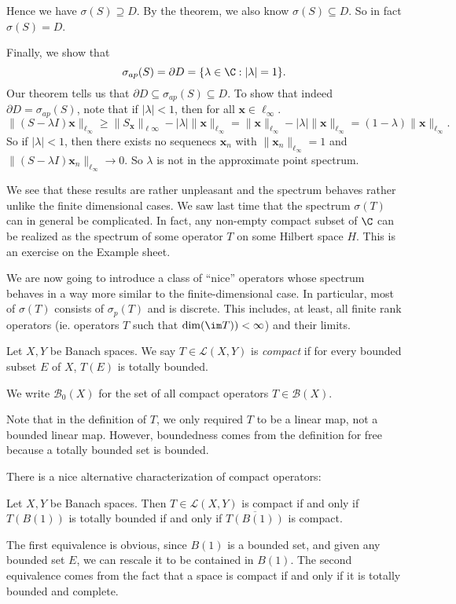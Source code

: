 \documentclass[a4paper]{article}
\begin{document}
\begin{eg}
  Hence we have $\sigma(S) \supseteq D$. By the theorem, we also know $\sigma(S) \subseteq D$. So in fact $\sigma(S) = D$.

  Finally, we show that
  \[
    \sigma_{ap}(S) = \partial D = \{\lambda \in \C: |\lambda| = 1\}.
  \]
  Our theorem tells us that $\partial D \subseteq \sigma_{ap}(S) \subseteq D$. To show that indeed $\partial D = \sigma_{ap}(S)$, note that if $|\lambda| < 1$, then for all $\mathbf{x} \in \ell_\infty$.
  \[
    \|(S - \lambda I)\mathbf{x}\|_{\ell_\infty} \geq \|S_\mathbf{x}\|_{\ell\infty} - |\lambda|\|\mathbf{x}\|_{\ell_\infty} = \|\mathbf{x}\|_{\ell_\infty} - |\lambda| \|\mathbf{x}\|_{\ell_\infty} = (1 - \lambda) \|\mathbf{x}\|_{\ell_\infty}.
  \]
  So if $|\lambda| < 1$, then there exists no sequenecs $\mathbf{x}_n$ with $\|\mathbf{x}_n\|_{\ell_\infty} = 1$ and $\|(S - \lambda I) \mathbf{x}_n \|_{\ell_\infty} \to 0$. So $\lambda$ is not in the approximate point spectrum.
\end{eg}
We see that these results are rather unpleasant and the spectrum behaves rather unlike the finite dimensional cases. We saw last time that the spectrum $\sigma(T)$ can in general be complicated. In fact, any non-empty compact subset of $\C$ can be realized as the spectrum of some operator $T$ on some Hilbert space $H$. This is an exercise on the Example sheet.

We are now going to introduce a class of ``nice'' operators whose spectrum behaves in a way more similar to the finite-dimensional case. In particular, most of $\sigma(T)$ consists of $\sigma_p(T)$ and is discrete. This includes, at least, all finite rank operators (ie. operators $T$ such that $\dim (\im T)) < \infty$) and their limits.

\begin{defi}
  Let $X, Y$ be Banach spaces. We say $T \in \mathcal{L}(X, Y)$ is \emph{compact} if for every bounded subset $E$ of $X$, $T(E)$ is totally bounded.

  We write $\mathcal{B}_0(X)$ for the set of all compact operators $T \in \mathcal{B}(X)$.
\end{defi}
Note that in the definition of $T$, we only required $T$ to be a linear map, not a bounded linear map. However, boundedness comes from the definition for free because a totally bounded set is bounded.

There is a nice alternative characterization of compact operators:
\begin{prop}
  Let $X, Y$ be Banach spaces. Then $T \in \mathcal{L}(X, Y)$ is compact if and only if $T(B(1))$ is totally bounded if and only if $\overline{T(B(1))}$ is compact.
\end{prop}
The first equivalence is obvious, since $B(1)$ is a bounded set, and given any bounded set $E$, we can rescale it to be contained in $B(1)$. The second equivalence comes from the fact that a space is compact if and only if it is totally bounded and complete.
\end{document}
